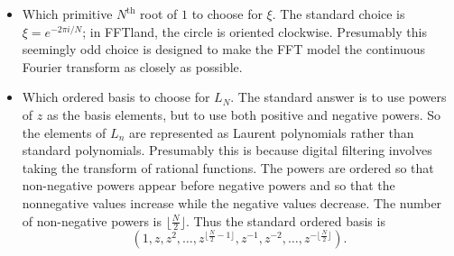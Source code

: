 \documentclass[12pt, letter, oneside]{amsart}
\theoremstyle{definition}
\theoremstyle{plain}
\numberwithin{equation}{para}
\numberwithin{figure}{section}
\renewcommand{\th}{\text{th}}
\begin{document}
\begin{itemize}
\item Which primitive $N^\th$ root of $1$ to choose for $\xi$.  The standard
choice is $\xi = e^{-2\pi i/N}$; in FFTland, the circle is oriented clockwise.
Presumably this seemingly odd choice is designed to make the FFT model the
continuous Fourier transform as closely as possible.

\item Which ordered basis to choose for $L_N$.  The standard answer is to use
powers of $z$ as the basis elements, but to use both positive and negative
powers.  So the elements of $L_n$ are represented as Laurent polynomials
rather than standard polynomials.  Presumably this is because digital filtering
involves taking the transform of rational functions.  The powers are ordered
so that non-negative powers appear before negative powers and so that the
nonnegative values increase while the negative values decrease. The number
of non-negative powers is $\lfloor \frac{N}{2}\rfloor$.  Thus the standard ordered
basis is
$$(1, z, z^2, \ldots, z^{\lfloor \frac{N}{2} - 1\rfloor}, z^{-1}, z^{-2},
\ldots, z^{-\lfloor \frac{N}{2}\rfloor}).$$
\end{itemize}
\end{document}
